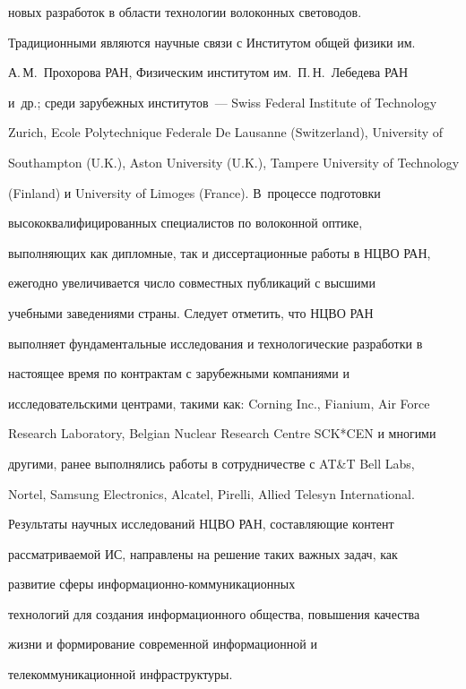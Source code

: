 новых разработок в области технологии волоконных световодов. 


Традиционными являются научные связи с Институтом общей физики им.\ 


А.\,М.~Прохорова РАН, Физическим институтом им.\ П.\,Н.~Лебедева РАН 


и~др.; среди зарубежных институтов~--- Swiss Federal Institute of Technology 


Zurich, Ecole Polytechnique Federale De Lausanne (Switzerland), University of 


Southampton (U.K.), Aston University (U.K.), Tampere University of Technology 


(Finland) и University of Limoges (France). В~процессе подготовки 


высококвалифицированных специалистов по волоконной оптике, 


выполняющих как дипломные, так и диссертационные работы в НЦВО РАН, 


ежегодно увеличивается число совместных публикаций с высшими 


учебными заведениями страны. Следует отметить, что НЦВО РАН 


выполняет фундаментальные исследования и технологические разработки в 


настоящее время по контрактам с зарубежными компаниями и 


исследовательскими центрами, такими как: Corning Inc., Fianium, Air Force 


Research Laboratory, Belgian Nuclear Research Centre SCK*CEN и многими 


другими, ранее выполнялись работы в сотрудничестве с AT\&T Bell Labs, 


Nortel, Samsung Electronics, Alcatel, Pirelli, Allied Telesyn International.


     


     Результаты научных исследований НЦВО РАН, составляющие контент 


рассматриваемой ИС, направлены на решение таких важных задач, как 


развитие сферы ин\-фор\-ма\-ци\-он\-но-ком\-му\-ни\-ка\-ци\-он\-ных 


технологий для создания информационного общества, повышения качества 


жизни и формирование современной информационной и 


телекоммуникационной инфраструктуры. 


